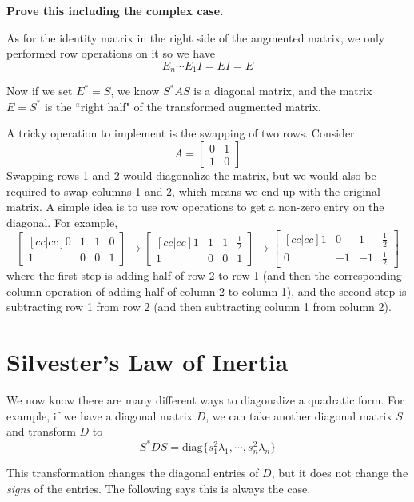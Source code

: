 \textbf{Prove this including the complex case. }

As for the identity matrix in the right side of the augmented matrix, we only performed row operations on it so we have 
$$E_{n} \cdots E_{1} I = EI = E$$

Now if we set $E^{*} = S$, we know $S^{*}AS$ is a diagonal matrix, and the matrix $E = S^{*}$ is the ``right half" of the transformed augmented matrix. 

A tricky operation to implement is the swapping of two rows. Consider 
$$A = \begin{bmatrix}
0 & 1 \\
1 & 0
\end{bmatrix}$$
Swapping rows 1 and 2 would diagonalize the matrix, but we would also be required to swap columns 1 and 2, which means we end up with the original matrix. A simple idea is to use row operations to get a non-zero entry on the diagonal. For example, 
$$\begin{bmatrix}[cc|cc]
0 & 1 & 1 & 0 \\
1 & 0 & 0 & 1
\end{bmatrix} \rightarrow \begin{bmatrix}[cc|cc] 
1 & 1 & 1 & \frac{1}{2} \\
1 & 0 & 0 & 1
\end{bmatrix} \rightarrow \begin{bmatrix}[cc|cc] 
1 & 0 & 1 & \frac{1}{2} \\
0 & -1 & -1 & \frac{1}{2}
\end{bmatrix}
$$
where the first step is adding half of row 2 to row 1 (and then the corresponding column operation of adding half of column 2 to column 1), and the second step is subtracting row 1 from row 2 (and then subtracting column 1 from column 2). 

\section{Silvester's Law of Inertia} 

We now know there are many different ways to diagonalize a quadratic form. For example, if we have a diagonal matrix $D$, we can take another diagonal matrix $S$ and transform $D$ to 
$$S^{*} DS = \text{diag}\{ s_{1}^{2} \lambda_{1}, \cdots, s_{n}^{2} \lambda_{n} \}$$

This transformation changes the diagonal entries of $D$, but it does not change the \textit{signs} of the entries. The following says this is always the case. 

